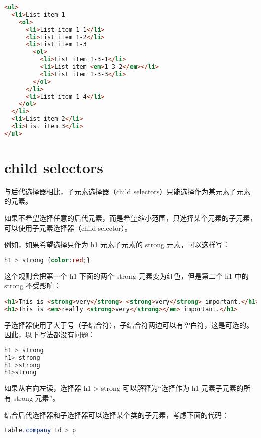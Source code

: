 \begin{lstlisting}[language=HTML]
<ul>
  <li>List item 1
    <ol>
      <li>List item 1-1</li>
      <li>List item 1-2</li>
      <li>List item 1-3
        <ol>
          <li>List item 1-3-1</li>
          <li>List item <em>1-3-2</em></li>
          <li>List item 1-3-3</li>
        </ol>
      </li>
      <li>List item 1-4</li>
    </ol>
  </li>
  <li>List item 2</li>
  <li>List item 3</li>
</ul>
\end{lstlisting}


\section{child selectors}



与后代选择器相比，子元素选择器（child selectors）只能选择作为某元素子元素的元素。



如果不希望选择任意的后代元素，而是希望缩小范围，只选择某个元素的子元素，可以使用子元素选择器（child selector）。

例如，如果希望选择只作为 h1 元素子元素的 strong 元素，可以这样写：


\begin{lstlisting}[language=CSS]
h1 > strong {color:red;}
\end{lstlisting}

这个规则会把第一个 h1 下面的两个 strong 元素变为红色，但是第二个 h1 中的 strong 不受影响：


\begin{lstlisting}[language=HTML]
<h1>This is <strong>very</strong> <strong>very</strong> important.</h1>
<h1>This is <em>really <strong>very</strong></em> important.</h1>
\end{lstlisting}


子选择器使用了大于号（子结合符），子结合符两边可以有空白符，这是可选的。因此，以下写法都没有问题：


\begin{lstlisting}[language=CSS]
h1 > strong
h1> strong
h1 >strong
h1>strong
\end{lstlisting}

如果从右向左读，选择器 h1 > strong 可以解释为“选择作为 h1 元素子元素的所有 strong 元素”。

结合后代选择器和子选择器可以选择某个类的子元素，考虑下面的代码：

\begin{lstlisting}[language=CSS]
table.company td > p
\end{lstlisting}

